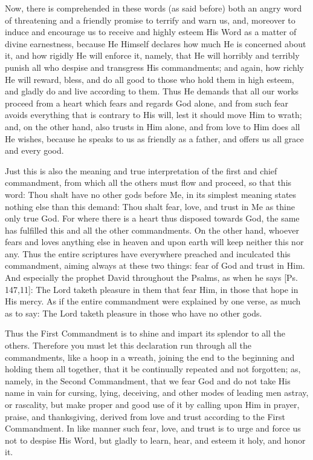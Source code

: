 Now, there is comprehended in these words (as said before) both an
angry word of threatening and a friendly promise to terrify and warn
us, and, moreover to induce and encourage us to receive and highly
esteem His Word as a matter of divine earnestness, because He Himself
declares how much He is concerned about it, and how rigidly He will
enforce it, namely, that He will horribly and terribly punish all who
despise and transgress His commandments; and again, how richly He will
reward, bless, and do all good to those who hold them in high esteem,
and gladly do and live according to them. Thus He demands that all our
works proceed from a heart which fears and regards God alone, and from
such fear avoids everything that is contrary to His will, lest it
should move Him to wrath; and, on the other hand, also trusts in Him
alone, and from love to Him does all He wishes, because he speaks to us
as friendly as a father, and offers us all grace and every good.

Just this is also the meaning and true interpretation of the first and
chief commandment, from which all the others must flow and proceed, so
that this word: Thou shalt have no other gods before Me, in its
simplest meaning states nothing else than this demand: Thou shalt fear,
love, and trust in Me as thine only true God. For where there is a
heart thus disposed towards God, the same has fulfilled this and all
the other commandments. On the other hand, whoever fears and loves
anything else in heaven and upon earth will keep neither this nor any.
Thus the entire scriptures have everywhere preached and inculcated this
commandment, aiming always at these two things: fear of God and trust
in Him. And especially the prophet David throughout the Psalms, as when
he says [Ps. 147,11]: The Lord taketh pleasure in them that fear Him,
in those that hope in His mercy. As if the entire commandment were
explained by one verse, as much as to say: The Lord taketh pleasure in
those who have no other gods.

Thus the First Commandment is to shine and impart its splendor to all
the others. Therefore you must let this declaration run through all the
commandments, like a hoop in a wreath, joining the end to the beginning
and holding them all together, that it be continually repeated and not
forgotten; as, namely, in the Second Commandment, that we fear God and
do not take His name in vain for cursing, lying, deceiving, and other
modes of leading men astray, or rascality, but make proper and good use
of it by calling upon Him in prayer, praise, and thanksgiving, derived
from love and trust according to the First Commandment. In like manner
such fear, love, and trust is to urge and force us not to despise His
Word, but gladly to learn, hear, and esteem it holy, and honor it.

